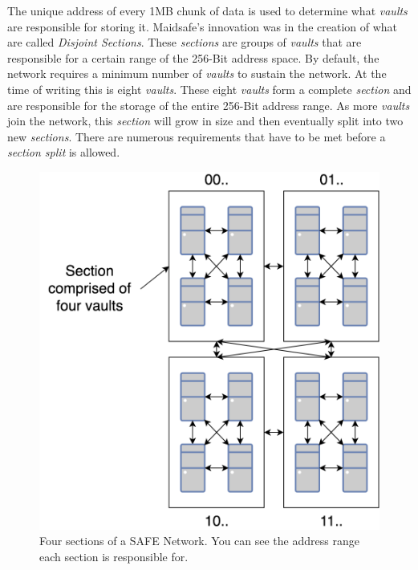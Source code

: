 The unique address of every 1MB chunk of data is used to determine what \textit{vaults} are responsible for storing it. Maidsafe's innovation was in the creation of what are called \textit{Disjoint Sections}. These \textit{sections} are groups of \textit{vaults} that are responsible for a certain range of the 256-Bit address space. By default, the network requires a minimum number of \textit{vaults} to sustain the network. At the time of writing this is eight \textit{vaults}. These eight \textit{vaults} form a complete \textit{section} and are responsible for the storage of the entire 256-Bit address range. As more \textit{vaults} join the network, this \textit{section} will grow in size and then eventually split into two new \textit{sections}. There are numerous requirements that have to be met before a \textit{section split} is allowed.

\begin{figure}
	\begin{center}
		\includegraphics[scale=0.3]{diagrams/safe-network-sections}
		\caption{Four sections of a SAFE Network. You can see the address range each section is responsible for.}
		\label{fig:safe-sections}
	\end{center}
\end{figure}

